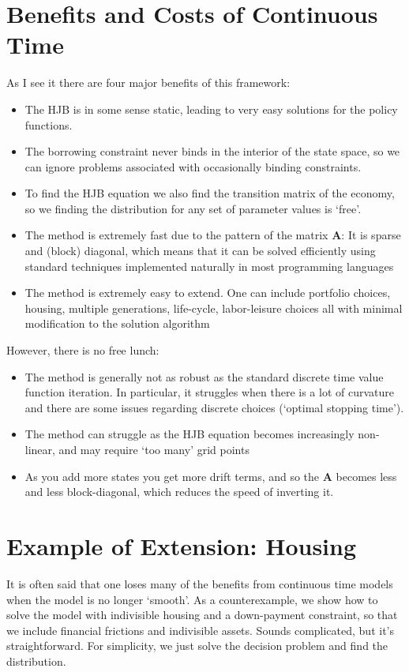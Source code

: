 \documentclass[12pt]{article}
\DeclareMathOperator{\1}{\mathbbm{1}}
\begin{document}
\section{Benefits and Costs of Continuous Time}
As I see it there are four major benefits of this framework:
\begin{itemize}
\item The HJB is in some sense static, leading to very easy solutions for the policy functions.
\item The borrowing constraint never binds in the interior of the state space, so we can ignore problems associated with occasionally binding constraints.
\item To find the HJB equation we also find the transition matrix of the economy, so we finding the distribution for any set of parameter values is `free'.
\item The method is extremely fast due to the pattern of the matrix $\mathbf{A}$: It is sparse and (block) diagonal, which means that it can be solved efficiently using standard techniques implemented naturally in most programming languages
\item The method is extremely easy to extend. One can include portfolio choices, housing, multiple generations, life-cycle, labor-leisure choices all with minimal modification to the solution algorithm
\end{itemize}

However, there is no free lunch:
\begin{itemize}
\item The method is generally not as robust as the standard discrete time value function iteration. In particular, it struggles when there is a lot of curvature and there are some issues regarding discrete choices (`optimal stopping time').
\item The method can struggle as the HJB equation becomes increasingly non-linear, and may require `too many' grid points
\item As you add more states you get more drift terms, and so the $\mathbf{A}$ becomes less and less block-diagonal, which reduces the speed of inverting it.
\end{itemize}

\section{Example of Extension: Housing}
It is often said that one loses many of the benefits from continuous time models when the model is no longer `smooth'. As a counterexample, we show how to solve the model with indivisible housing and a down-payment constraint, so that we include financial frictions and indivisible assets. Sounds complicated, but it's straightforward. For simplicity, we just solve the decision problem and find the distribution.
\end{document}
